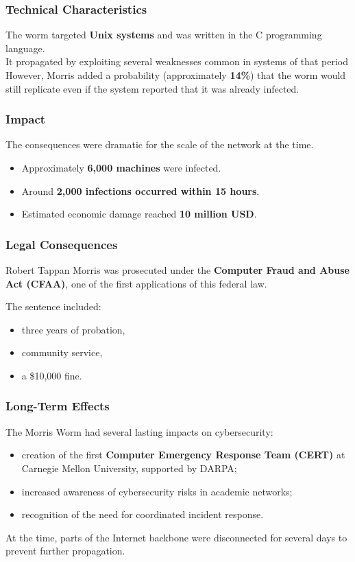 \subsubsection*{Technical Characteristics}

The worm targeted \textbf{Unix systems} and was written in the C programming language.
\\
It propagated by exploiting several weaknesses common in systems of that period\\
However, Morris added a probability (approximately \textbf{14\%}) that the worm would still replicate even if the system reported that it was already infected. 

\subsubsection*{Impact}

The consequences were dramatic for the scale of the network at the time.

\begin{itemize}
\item Approximately \textbf{6,000 machines} were infected.
\item Around \textbf{2,000 infections occurred within 15 hours}.
\item Estimated economic damage reached \textbf{10 million USD}.
\end{itemize}

\subsubsection*{Legal Consequences}

Robert Tappan Morris was prosecuted under the \textbf{Computer Fraud and Abuse Act (CFAA)}, one of the first applications of this federal law.

The sentence included:
\begin{itemize}
\item three years of probation,
\item community service,
\item a \$10,000 fine.
\end{itemize}

\subsubsection*{Long-Term Effects}

The Morris Worm had several lasting impacts on cybersecurity:

\begin{itemize}
\item creation of the first \textbf{Computer Emergency Response Team (CERT)} at Carnegie Mellon University, supported by DARPA;
\item increased awareness of cybersecurity risks in academic networks;
\item recognition of the need for coordinated incident response.
\end{itemize}

\noindent
At the time, parts of the Internet backbone were disconnected for several days to prevent further propagation.
